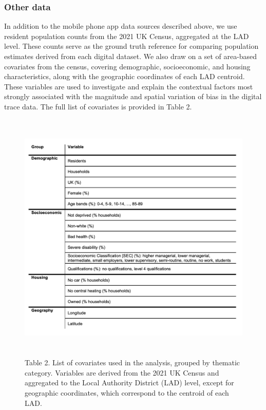 \documentclass[]{rsos}%
\begin{document}
\subsubsection{Other data}\label{other-data}

In addition to the mobile phone app data sources described above, we use resident population counts from the 2021 UK Census, aggregated at the LAD level. These counts serve as the ground truth reference for comparing population estimates derived from each digital dataset. We also draw on a set of area-based covariates from the census, covering demographic, socioeconomic, and housing characteristics, along with the geographic coordinates of each LAD centroid. These variables are used to investigate and explain the contextual factors most strongly associated with the magnitude and spatial variation of bias in the digital trace data. The full list of covariates is provided in Table 2.

\begin{figure}
\centering
\includegraphics[width=4.6875in,height=4.79167in]{figures/table-census-data.png}
\caption{Table 2. List of covariates used in the analysis, grouped by thematic category. Variables are derived from the 2021 UK Census and aggregated to the Local Authority District (LAD) level, except for geographic coordinates, which correspond to the centroid of each LAD.}
\end{figure}
\end{document}
